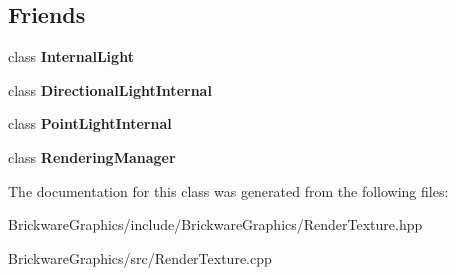 \subsection*{Friends}
\begin{DoxyCompactItemize}
\item 
\hypertarget{classBrickware_1_1Graphics_1_1RenderTexture_aea2864acc90890ef2bdd62187fac4a58}{}class {\bfseries Internal\+Light}\label{classBrickware_1_1Graphics_1_1RenderTexture_aea2864acc90890ef2bdd62187fac4a58}

\item 
\hypertarget{classBrickware_1_1Graphics_1_1RenderTexture_a0c1113485595ada9795ea92a3791a121}{}class {\bfseries Directional\+Light\+Internal}\label{classBrickware_1_1Graphics_1_1RenderTexture_a0c1113485595ada9795ea92a3791a121}

\item 
\hypertarget{classBrickware_1_1Graphics_1_1RenderTexture_a63a6c2c4df25a9ee153e5cf241d1d24e}{}class {\bfseries Point\+Light\+Internal}\label{classBrickware_1_1Graphics_1_1RenderTexture_a63a6c2c4df25a9ee153e5cf241d1d24e}

\item 
\hypertarget{classBrickware_1_1Graphics_1_1RenderTexture_af97d60083cbec9dff36ea5566c308d6d}{}class {\bfseries Rendering\+Manager}\label{classBrickware_1_1Graphics_1_1RenderTexture_af97d60083cbec9dff36ea5566c308d6d}

\end{DoxyCompactItemize}


The documentation for this class was generated from the following files\+:\begin{DoxyCompactItemize}
\item 
Brickware\+Graphics/include/\+Brickware\+Graphics/Render\+Texture.\+hpp\item 
Brickware\+Graphics/src/Render\+Texture.\+cpp\end{DoxyCompactItemize}
